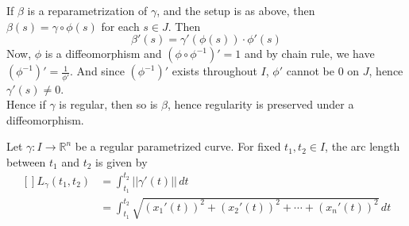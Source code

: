 \begin{observe}[]
    If $\beta$ is a reparametrization of $\gamma$, and the setup is as above, then $\beta(s)=\gamma\circ\phi(s)$ for each $s\in J$. Then $$\beta'(s)=\gamma'(\phi(s))\cdot\phi'(s)$$
    Now, $\phi$ is a diffeomorphism and $(\phi\circ\phi^{-1})' = 1$ and by chain rule, we have $(\phi^{-1})'=\frac{1}{\phi'}$. And since $(\phi^{-1})'$ exists throughout $I$, $\phi'$ cannot be $0$ on $J$, hence $\gamma'(s)\neq0$.\\ 
    Hence if $\gamma$ is regular, then so is $\beta$, hence regularity is preserved under a diffeomorphism.
\end{observe}
\vspace{0.4cm}
\begin{definition}
    Let $\gamma:I\to\mathbb{R}^{n}$ be a regular parametrized curve. For fixed $t_1,t_2\in I$, the arc length between $t_{1}$ and $t_{2}$ is given by $$\begin{aligned}[]
        L_{\gamma}(t_1,t_2)&=\int_{t_1}^{t_2}||\gamma'(t)||\,dt\\
                           &=\int_{t_1}^{t_2}\sqrt{(x_1'(t))^{2}+(x_2'(t))^{2}+\cdots+(x_n'(t))^{2}}\,dt
    \end{aligned}
    $$
\end{definition}

